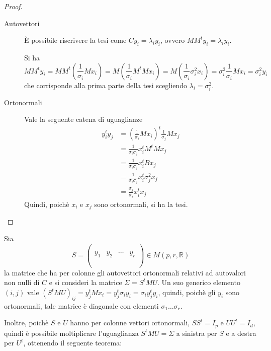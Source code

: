 \documentclass[12pt,a4paper]{article}
\theoremstyle{thm}
\theoremstyle{def}
\begin{document}
\begin{proof}~

\begin{description}
\item[{\sc Autovettori}] È possibile riscrivere la tesi come $Cy_i = \lambda_i y_i$, ovvero $MM^ty_i = \lambda_i y_i$.

Si ha \[
	MM^ty_i = MM^t\left(\frac{1}{\sigma_i}Mx_i\right) =
	M\left(\frac{1}{\sigma_i}M^tMx_i\right) =
	M \left(\frac{1}{\sigma_i}\sigma_i^2x_i\right) =
	\sigma_i^2 \frac{1}{\sigma_i} Mx_i =
	\sigma_i^2 y_i
\] che corrisponde alla prima parte della tesi scegliendo $\lambda_i = \sigma_i^2$.

\item[{\sc Ortonormali}] Vale la seguente catena di uguaglianze
\begin{align*}
y_i^t y_j & = \left( \frac{1}{\sigma_i} M x_i \right) ^t \frac{1}{\sigma_j}M x_j\\
& = \frac{1}{\sigma_i \sigma_j} x_i^t M^t M x_j\\
& = \frac{1}{\sigma_i \sigma_j} x_i^t B x_j\\
& = \frac{1}{\sigma_i \sigma_j} x_i^t \sigma_j^2 x_j\\
& = \frac{\sigma_j}{\sigma_i} x_i^t x_j
\end{align*}
Quindi, poichè $x_i$ e $x_j$ sono ortonormali, si ha la tesi.
\end{description}
\end{proof}

\vspace{0.5cm}

Sia $$S = \left(\begin{array}{c|c|c|c} & & & \\ & & & \\ y_1 & y_2 & \cdots& y_r\\ & & & \\ & & & \\ \end{array}\right) \in M(p,r, \mathds{R})$$ la matrice che ha per colonne gli autovettori ortonormali relativi ad autovalori non nulli di $C$ e si consideri la matrice $\Sigma=S^tMU$. Un suo generico elemento $(i, j)$ vale $(S^tMU)_{ij} = y_j^tMx_i = y_j^t \sigma_i y_i = \sigma_i y_j^t y_i$, quindi, poichè gli $y_i$ sono ortonormali, tale matrice è diagonale con elementi $\sigma_1\dots\sigma_r$.

Inoltre, poichè $S$ e $U$ hanno per colonne vettori ortonormali, $SS^t = I_p$ e $UU^t = I_d$, quindi è possibile moltiplicare l'uguaglianza $S^tMU = \Sigma$ a sinistra per $S$ e a destra per $U^t$, ottenendo il seguente teorema:
\end{document}
